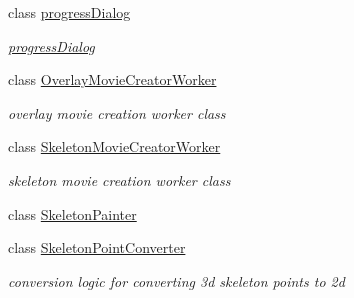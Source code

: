 \begin{DoxyCompactItemize}
class \hyperlink{class_u_t_kinect_skeleton_movement_detector_1_1progress_dialog}{progress\-Dialog}
\begin{DoxyCompactList}\small\item\em \hyperlink{class_u_t_kinect_skeleton_movement_detector_1_1progress_dialog}{progress\-Dialog} \end{DoxyCompactList}\item 
class \hyperlink{class_u_t_kinect_skeleton_movement_detector_1_1_overlay_movie_creator_worker}{Overlay\-Movie\-Creator\-Worker}
\begin{DoxyCompactList}\small\item\em overlay movie creation worker class \end{DoxyCompactList}\item 
class \hyperlink{class_u_t_kinect_skeleton_movement_detector_1_1_skeleton_movie_creator_worker}{Skeleton\-Movie\-Creator\-Worker}
\begin{DoxyCompactList}\small\item\em skeleton movie creation worker class \end{DoxyCompactList}\item 
class \hyperlink{class_u_t_kinect_skeleton_movement_detector_1_1_skeleton_painter}{Skeleton\-Painter}
\item 
class \hyperlink{class_u_t_kinect_skeleton_movement_detector_1_1_skeleton_point_converter}{Skeleton\-Point\-Converter}
\begin{DoxyCompactList}\small\item\em conversion logic for converting 3d skeleton points to 2d \end{DoxyCompactList}\end{DoxyCompactItemize}
